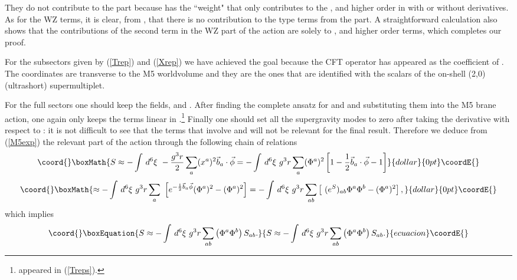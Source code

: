 \documentclass[a4paper,11pt]{article}
\begin{document}
They do not contribute to the \coordHE{} part because  has
the ``weight" \coordHE{} that only contributes to the
\coordHE{}, \coordHE{} and higher order in \myHighlight{$\vec{\phi}$}\coordHE{} with or without
derivatives. As for the WZ terms, it is clear, from , that
there is no contribution to the \coordHE{} type terms from the \coordHE{} part. A straightforward calculation also shows that the
contributions of the second term in the WZ part of the action are
solely to \coordHE{}, \coordHE{} and higher order terms, which completes
our proof.



For the subsectors given by (\ref{Trep}) and (\ref{Xrep}) we have
achieved the goal because the CFT operator has appeared as the
coefficient of \myHighlight{$\vec{\phi}$}\coordHE{}. The coordinates \coordHE{} are transverse
to the M5 worldvolume and they are the ones that are identified
with the scalars \coordHE{} of the on-shell (2,0) (ultrashort)
supermultiplet.

For the full sectors one should keep the fields, \coordHE{}
and \coordHE{}. After finding the complete ansatz for
\coordHE{} and \coordHE{} and substituting them into the M5
brane action, one again only keeps the terms linear in
\coordHE{}.\footnote{\coordHE{} appeared in (\ref{Treps}).} Finally
one should set all the supergravity modes to zero after taking the
derivative with respect to \coordHE{}: it is not difficult to see
that the terms that involve \coordHE{} and \coordHE{} will
not be relevant for the final result. Therefore we deduce from
(\ref{M5exp}) the relevant part of the action through the
following chain of relations
$$\coord{}\boxMath{
S\approx -\int\,d^6\xi~-{g^3 r\over 2}\sum_a (x^a)^2 \vec{b}_a\cdot \vec{\phi}
=-\int\,d^6\xi~g^3 r\sum_a (\Phi^a)^2\left[1-{1\over 2}\vec{b}_a\cdot
\vec{\phi}-1 \right]
}{dollar}{0pt}\coordE{}$$  $$\coord{}\boxMath{
\approx -\int\,d^6\xi~g^3 r \sum_a~ \left[e^{-{1\over 2}\vec{b}_a
\vec{\phi}}(\Phi^a)^2-(\Phi^a)^2\right]=-\int\,d^6\xi~g^3 r
\sum_{ab}\left[~(e^S)_{ab} \Phi^a \Phi^b -(\Phi^a)^2\right],
}{dollar}{0pt}\coordE{}$$
which implies
\begin{equation}\coord{}\boxEquation{\plabel{corr}
S\approx -\int\,d^6\xi~g^3 r  \sum_{ab}
\left( \Phi^a \Phi^b\right)S_{ab}.
}{S\approx -\int\,d^6\xi~g^3 r  \sum_{ab}
\left( \Phi^a \Phi^b\right)S_{ab}.
}{ecuacion}\coordE{}\end{equation}
\end{document}
